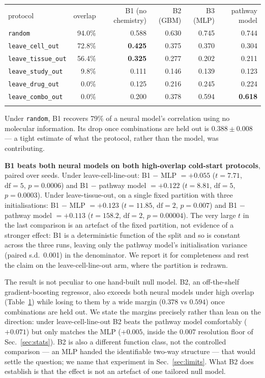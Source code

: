 \documentclass{ws-procs11x85}
\begin{document}
\begin{table}[ht]
{\begin{tabular}{@{}lrrrrr@{}} \toprule
protocol & overlap & B1 (no chemistry) & B2 (GBM) & B3 (MLP) & pathway model \\ \colrule
{\tt random} & 94.0\% & 0.588 & 0.630 & 0.745 & 0.744 \\
{\tt leave\_cell\_out} & 72.8\% & \textbf{0.425} & 0.375 & 0.370 & 0.304 \\
{\tt leave\_tissue\_out} & 56.4\% & \textbf{0.325} & 0.277 & 0.202 & 0.211 \\
{\tt leave\_study\_out} & 9.8\% & 0.111 & 0.146 & 0.139 & 0.123 \\
{\tt leave\_drug\_out} & 0.0\% & 0.125 & 0.216 & 0.245 & 0.224 \\
{\tt leave\_combo\_out} & 0.0\% & 0.200 & 0.378 & 0.594 & \textbf{0.618} \\ \botrule
\end{tabular}}
\label{tab:main}
\end{table}

Under {\tt random}, B1 recovers 79\% of a neural model's correlation using no
molecular information. Its drop once combinations are held out is $0.388 \pm
0.008$ --- a tight estimate of what the protocol, rather than the model, was
contributing.

\textbf{B1 beats both neural models on both high-overlap cold-start protocols},
paired over seeds. Under leave-cell-line-out: B1 $-$ MLP $= +0.055$ ($t = 7.71$,
$\mathrm{df} = 5$, $p = 0.0006$) and B1 $-$ pathway model $= +0.122$ ($t = 8.81$,
$\mathrm{df} = 5$, $p = 0.0003$). Under leave-tissue-out, on a single fixed
partition with three initialisations: B1 $-$ MLP $= +0.123$ ($t = 11.85$,
$\mathrm{df} = 2$, $p = 0.007$) and B1 $-$ pathway model $= +0.113$ ($t = 158.2$,
$\mathrm{df} = 2$, $p = 0.00004$). The very large $t$ in the last comparison is
an artefact of the fixed partition, not evidence of a stronger effect: B1 is a
deterministic function of the split and so is constant across the three runs,
leaving only the pathway model's initialisation variance (paired s.d.\ 0.001) in
the denominator. We report it for completeness and rest the claim on the
leave-cell-line-out arm, where the partition is redrawn.

The result is not peculiar to one hand-built null model. B2, an off-the-shelf
gradient-boosting regressor, also exceeds both neural models under high overlap
(Table~\ref{tab:main}) while losing to them by a wide margin ($0.378$ vs $0.594$)
once combinations are held out. We state the margins precisely rather than lean
on the direction: under leave-cell-line-out B2 beats the pathway model
comfortably ($+0.071$) but only matches the MLP ($+0.005$, inside the 0.007
resolution floor of Sec.~\ref{sec:stats}). B2 is also a different function class,
not the controlled comparison --- an MLP handed the identifiable two-way
structure --- that would settle the question; we name that experiment in
Sec.~\ref{sec:limits}. What B2 does establish is that the effect is not an
artefact of one tailored null model.
\end{document}
